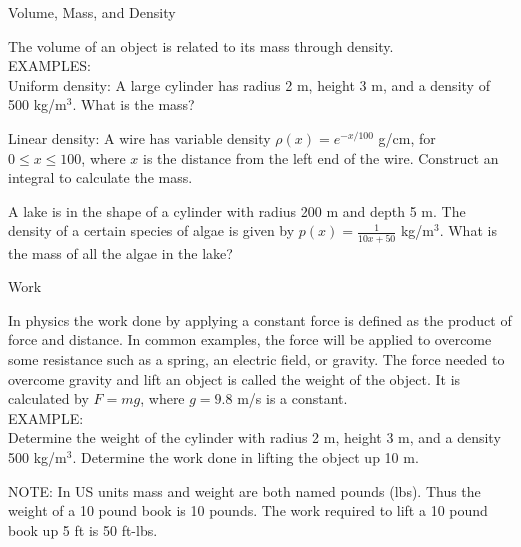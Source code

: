 \documentclass[11pt]{article}
\begin{document}
\pagebreak

\begin{center}
\Large
\rm{Volume, Mass, and Density}
\\
\end{center}

The volume of an object is related to its mass through density.  \\

EXAMPLES:\\

Uniform density:  A large cylinder has radius 2 m, height 3 m, and a density of 500 kg/m$^3$.  What is the mass?\\

\vspace{0.6in}

Linear density:  A wire has variable density $\rho(x) = e^{-x/100}$ g/cm, for $0\leq x\leq 100$, where $x$ is the distance from the left end of the wire.  Construct an integral to calculate the mass. \\

\vspace{3in}

A lake is in the shape of a cylinder with radius 200 m and depth 5 m.  The density of a certain species of algae is given by
$p(x) = \frac{1}{10x+50}$ kg/m$^3$.  What is the mass of all the algae in the lake?

\pagebreak

\begin{center}
\Large
\rm{Work}
\\
\end{center}
In physics the work done by applying a constant force is defined as the product of force and distance.  In common examples, the force
will be applied to overcome some resistance such as a spring, an electric field, or gravity.  The force needed to overcome gravity and lift
an object is called the weight of the object. It is calculated by $F=mg$, where $g=9.8$ m/s is a constant.\\

EXAMPLE:\\

Determine the weight of the cylinder with radius 2 m, height 3 m, and a density 500 kg/m$^3$.  Determine the work done in lifting the object up 10 m.

\vspace{2in}

NOTE:  In US units mass and weight are both named pounds (lbs).  Thus the weight of a 10 pound book is 10 pounds.  The work required to lift
a 10 pound book up 5 ft is 50 ft-lbs.\\
\end{document}
